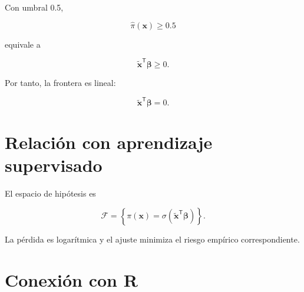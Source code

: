 \documentclass[
  spanish,
  10.5pt,
  letterpaper,
  DIV=11,
  numbers=noendperiod,
  oneside,
  open=any]{scrreprt}
\theoremstyle{definition}
\theoremstyle{definition}
\theoremstyle{plain}
\theoremstyle{remark}
\begin{document}
Con umbral 0.5,

\[
\widehat{\pi}(\mathbf{x})\geq 0.5
\]

equivale a

\[
\widetilde{\mathbf{x}}^{\mathsf T}\boldsymbol{\beta}\geq 0.
\]

Por tanto, la frontera es lineal:

\[
\widetilde{\mathbf{x}}^{\mathsf T}\boldsymbol{\beta}=0.
\]

\section*{Relación con aprendizaje
supervisado}\label{relaciuxf3n-con-aprendizaje-supervisado-1}


El espacio de hipótesis es

\[
\mathcal{F}
=
\left\{
\pi(\mathbf{x})
=
\sigma
\left(
\widetilde{\mathbf{x}}^{\mathsf T}\boldsymbol{\beta}
\right)
\right\}.
\]

La pérdida es logarítmica y el ajuste minimiza el riesgo empírico
correspondiente.

\section*{Conexión con R}\label{conexiuxf3n-con-r-9}

\end{document}
